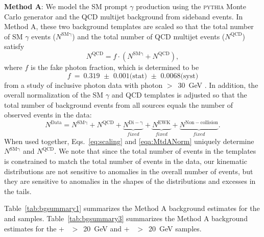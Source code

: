 \documentclass[12pt,twoside,letterpaper,doublespace]{article}
\begin{document}
\vspace{2ex}

\textbf{Method A}:  We model the SM prompt $\gamma$ production using the \textsc{pythia} Monte Carlo generator and the QCD multijet background from sideband events.  In Method A, these two background templates are scaled so that the total number of SM $\gamma$ events ($N^\mathrm{SM\gamma}$) and the total number of QCD multijet events ($N^\mathrm{QCD}$) satisfy
\begin{equation}
N^\mathrm{QCD} = f \cdot (N^\mathrm{SM\gamma}+N^\mathrm{QCD}),\label{eq:scaling}
\end{equation}
where $f$ is the fake photon fraction, which is determined to be
\begin{equation}
f~=~\mbox{0.319 $\pm$ 0.001(stat) $\pm$ 0.0068(syst)}\label{eq:fakefraction}
\end{equation}
from a study of inclusive photon data with photon \mbox{\et$>$ 30 GeV} \cite{ref:PhotonIDAndCESCPR}. In addition, the overall normalization of the SM $\gamma$ and QCD templates is adjusted so that the total number of background events from all sources equals the number of observed events in the data:
\begin{equation}
 N^\mathrm{Data} = N^\mathrm{SM\gamma}+N^\mathrm{QCD}+\underbrace{N^\mathrm{Di-\gamma}}_{fixed}+\underbrace{N^\mathrm{EWK}}_{fixed}+\underbrace{N^\mathrm{Non-collision}}_{fixed}.
\label{eqa:MtdANorm}
\end{equation}
When used together, Eqs.~\ref{eq:scaling} and \ref{eqa:MtdANorm} uniquely determine $N^\mathrm{SM\gamma}$ and $N^\mathrm{QCD}$.  We note that since the total number of events in the templates is constrained to match the total number of events in the data, our kinematic distributions are not sensitive to anomalies in the overall number of \phojets events, but they are sensitive to anomalies in the shapes of the distributions and excesses in the tails.

Table~\ref{tab:bgsummary1} summarizes the Method A background estimates for the \phoonejet and \photwojet samples.  Table~\ref{tab:bgsummary3} summarizes the Method A background estimates for the  \phoonejet + \met~$>$~20~GeV and \photwojet + \met~$>$~20~GeV samples.


\end{document}

